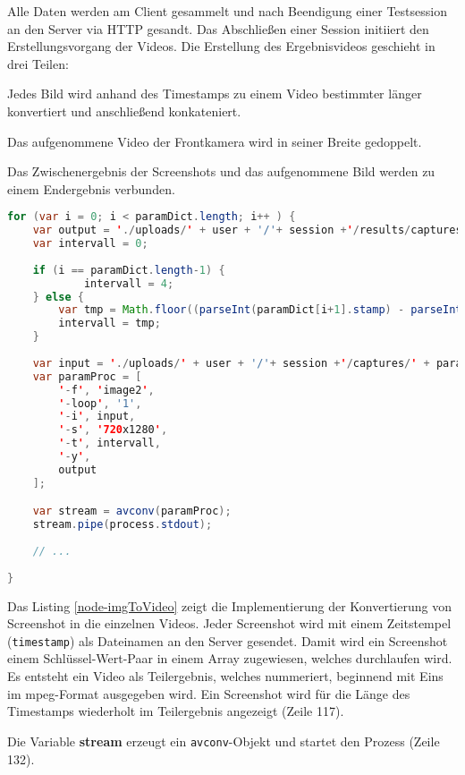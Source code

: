 Alle Daten werden am Client gesammelt und nach Beendigung einer Testsession an den Server via HTTP gesandt. 
Das Abschließen einer Session initiiert den Erstellungsvorgang der Videos. 
Die Erstellung des Ergebnisvideos geschieht in drei Teilen: 

\begin{compactitem}
	\item{Jedes Bild wird anhand des Timestamps zu einem Video bestimmter länger konvertiert und anschließend konkateniert.}
	\item{Das aufgenommene Video der Frontkamera wird in seiner Breite gedoppelt.}
	\item{Das Zwischenergebnis der Screenshots und das aufgenommene Bild werden zu einem Endergebnis verbunden.}
\end{compactitem}


\begin{lstlisting}[label=node-imgToVideo,language=Java, caption=Erstellung der Videos aus Screenshots, firstnumber=110]
for (var i = 0; i < paramDict.length; i++ ) {
	var output = './uploads/' + user + '/'+ session +'/results/captures/'+ (i+1)+'.mpg';
	var intervall = 0;
    
    if (i == paramDict.length-1) {
    		intervall = 4;
	} else {
		var tmp = Math.floor((parseInt(paramDict[i+1].stamp) - parseInt(paramDict[i].stamp)) / 1000);    
        intervall = tmp;
	}
	
	var input = './uploads/' + user + '/'+ session +'/captures/' + paramDict[i].filename;
	var paramProc = [
		'-f', 'image2',
		'-loop', '1',
		'-i', input,
		'-s', '720x1280',
		'-t', intervall,
		'-y',
		output
	];

	var stream = avconv(paramProc);
	stream.pipe(process.stdout);
	
	// ...
	
}
\end{lstlisting}

Das Listing \ref{node-imgToVideo} zeigt die Implementierung der Konvertierung von Screenshot in die einzelnen Videos. 
Jeder Screenshot wird mit einem Zeitstempel (\texttt{timestamp}) als Dateinamen an den Server gesendet. 
Damit wird ein Screenshot einem Schlüssel-Wert-Paar in einem Array zugewiesen, welches durchlaufen wird. 
Es entsteht ein Video als Teilergebnis, welches nummeriert, beginnend mit Eins im mpeg-Format ausgegeben wird. 
Ein Screenshot wird für die Länge des Timestamps wiederholt im Teilergebnis angezeigt (Zeile 117).

Die Variable \textbf{stream} erzeugt ein \texttt{avconv}-Objekt und startet den Prozess (Zeile 132). 


